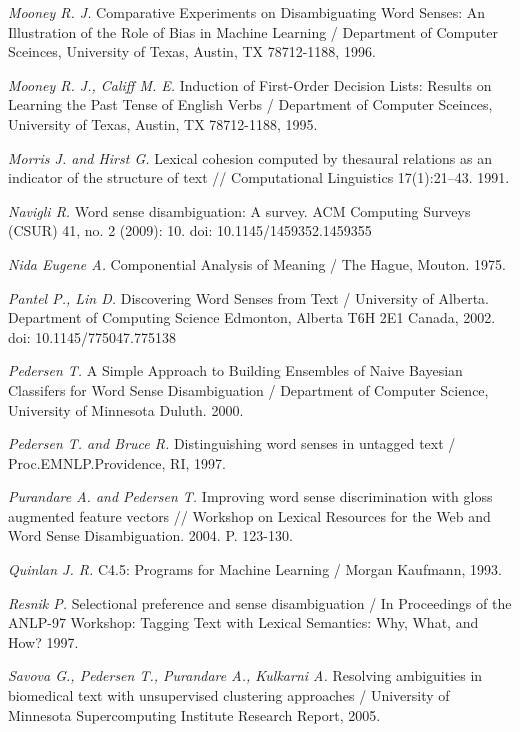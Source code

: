 \documentclass{article}
\begin{document}
\begin{articletext}
\begin{thebibliography}{9}
\textit{Mooney R. J. }Comparative Experiments on Disambiguating Word Senses:
An Illustration of the Role of Bias in Machine Learning / Department of Computer Sceinces, University of Texas, Austin, TX 78712-1188, 1996.

\textit{Mooney R. J., Califf M. E. }Induction of First-Order Decision Lists: Results on Learning the Past Tense of English Verbs / Department of Computer Sceinces, University of Texas, Austin, TX 78712-1188, 1995.

\textit{Morris J. and  Hirst G. }Lexical cohesion computed by thesaural relations as an indicator of the structure of text // Computational Linguistics 17(1):21–43. 1991. 

\textit{Navigli R. }Word sense disambiguation: A survey. ACM Computing Surveys (CSUR) 41, no. 2 (2009): 10. doi: 10.1145/1459352.1459355

\textit{Nida Eugene A. }Componential Analysis of Meaning / The Hague, Mouton. 1975.


\textit{Pantel P.,  Lin D. }Discovering Word Senses from Text / University of Alberta. Department of Computing Science Edmonton, Alberta T6H 2E1 Canada, 2002. doi: 10.1145/775047.775138

\textit{Pedersen T. }A Simple Approach to Building Ensembles of Naive Bayesian Classifers for Word Sense Disambiguation / Department of Computer Science, University of Minnesota Duluth. 2000.

\textit{Pedersen T. and  Bruce R. }Distinguishing word senses in untagged text / Proc.EMNLP.Providence, RI, 1997.

\textit{ Purandare A. and  Pedersen T. }Improving word sense discrimination with gloss augmented feature vectors // Workshop on Lexical Resources for the Web and Word Sense Disambiguation.  2004.  P. 123-130. 

\textit{Quinlan J. R. }C4.5: Programs for Machine Learning / Morgan Kaufmann, 1993. 

\textit{Resnik P. }Selectional preference and sense disambiguation / In Proceedings of the ANLP-97 Workshop: Tagging Text with Lexical Semantics: Why, What, and How? 1997.

\textit{Savova G., Pedersen T., Purandare A., Kulkarni A. }Resolving ambiguities in biomedical text with unsupervised clustering approaches / University of Minnesota Supercomputing Institute Research Report, 2005.
                          

\end{thebibliography}
\end{articletext}
\end{document}
